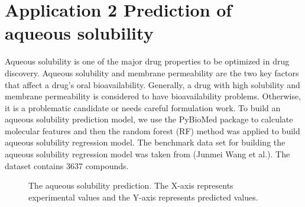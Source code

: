 \documentclass[letterpaper,10pt,english]{sphinxmanual}
\begin{document}
\section{Application 2 Prediction of aqueous solubility}
\label{application:application-2-prediction-of-aqueous-solubility}
Aqueous solubility is one of the major drug properties to be optimized in drug discovery. Aqueous solubility and membrane permeability are the two key factors that affect a drug’s oral bioavailability. Generally, a drug with high solubility and membrane permeability is considered to have bioavailability problems. Otherwise, it is a problematic candidate or needs careful formulation work. To build an aqueous solubility prediction model, we use the PyBioMed package to calculate molecular features and then the random forest (RF) method was applied to build aqueous solubility regression model. The benchmark data set for building the aqueous solubility regression model was taken from (Junmei Wang et al.). The dataset contains 3637 compounds.
\begin{figure}[htbp]
\centering
\capstart

\noindent{}
\caption{The aqueous solubility prediction. The X-axis represents experimental values and the Y-axis represents predicted values.}\label{application:id3}\end{figure}
\end{document}
